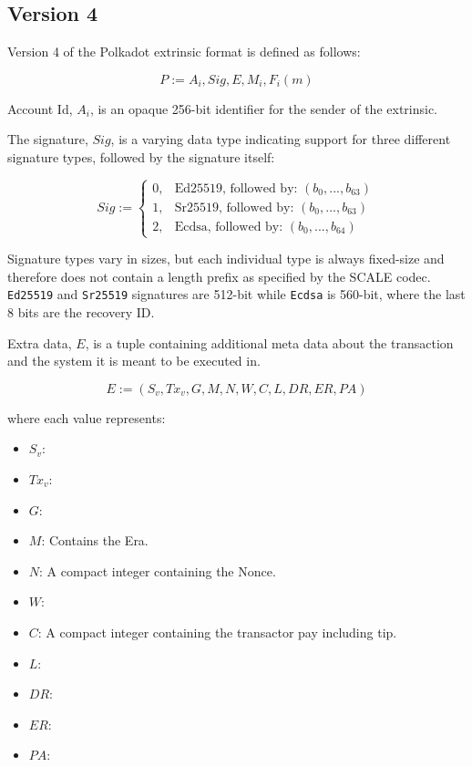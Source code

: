 \subsection{Version 4}

Version 4 of the Polkadot extrinsic format is defined as follows:

\[
    P := A_i, Sig, E, M_i, F_i(m)
\]

\begin{definition}
    Account Id, $A_i$, is an opaque 256-bit identifier for the sender of the
    extrinsic.
\end{definition}

\begin{definition}
    The signature, $Sig$, is a varying data type indicating support for three
    different signature types, followed by the signature itself:

    \[
        Sig :=
        \begin{cases}
        0, & \text{Ed25519, followed by: } (b_0, ...,b_{63}) \\
        1, & \text{Sr25519, followed by: } (b_0, ...,b_{63}) \\
        2, & \text{Ecdsa, followed by: } (b_0, ...,b_{64})
        \end{cases}
    \]

    Signature types vary in sizes, but each individual type is always fixed-size
    and therefore does not contain a length prefix as specified by the SCALE
    codec. \verb|Ed25519| and \verb|Sr25519| signatures are 512-bit while
    \verb|Ecdsa| is 560-bit, where the last 8 bits are the recovery ID.
\end{definition}

\begin{definition}
    Extra data, $E$, is a tuple containing additional meta data about the
    transaction and the system it is meant to be executed in. 

    \[
        E := (S_v, Tx_v, G, M, N, W, C, L, DR, ER, PA)
    \]

    where each value represents:
    \begin{itemize}
        \item $S_v$: 
        \item $Tx_v$: 
        \item $G$: 
        \item $M$: Contains the Era.
        \item $N$: A compact integer containing the Nonce.
        \item $W$: 
        \item $C$: A compact integer containing the transactor pay including tip.
        \item $L$: 
        \item $DR$: 
        \item $ER$: 
        \item $PA$: 
    \end{itemize}

\end{definition}

